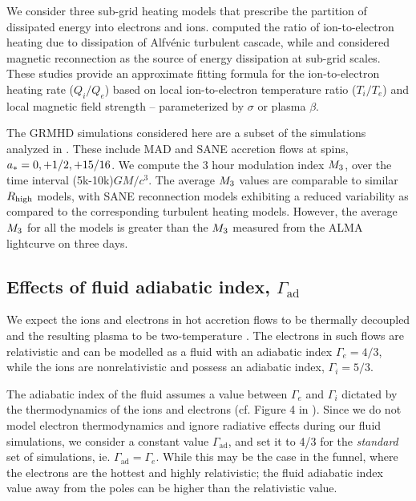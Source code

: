 We consider three sub-grid heating models that prescribe the partition of dissipated energy into electrons and ions. \citealt{2010MNRAS.409L.104H} computed the ratio of ion-to-electron heating due to dissipation of Alfv\'enic turbulent cascade, while \citealt{10.1093/mnras/stx2530} and \citealt{Rowan_2017} considered magnetic reconnection as the source of energy dissipation at sub-grid scales. These studies provide an approximate fitting formula for the ion-to-electron heating rate ($Q_{i}/Q_{e}$) based on local ion-to-electron temperature ratio ($T_{i}/T_{e}$) and local magnetic field strength -- parameterized by $\sigma$ or plasma $\beta$.

The GRMHD simulations considered here are a subset of the simulations analyzed in \citealt{2020MNRAS.494.4168D}. These include MAD and SANE accretion flows at spins, $a_* = 0,+1/2,+15/16$. We compute the 3 hour modulation index $M_{3}$, over the time interval (5k-10k)$GM/c^{3}$. The average $M_{3}$ values are comparable to similar $R_\mathrm{high}$ models, with SANE reconnection models exhibiting a reduced variability as compared to the corresponding turbulent heating models. However, the average $M_{3}$ for all the models is greater than the $M_{3}$ measured from the ALMA lightcurve on three days.

\subsection{Effects of fluid adiabatic index, \texorpdfstring{$\Gamma_\mathrm{ad}$}{Gad}}

We expect the ions and electrons in hot accretion flows to be thermally decoupled and the resulting plasma to be two-temperature \citep{1976ApJ...204..187S, Quataert_1998, 10.1093/mnras/stw3116, Ryan_2018}. The electrons in such flows are relativistic and can be modelled as a fluid with an adiabatic index $\Gamma_{e}=4/3$, while the ions are nonrelativistic and possess an adiabatic index, $\Gamma_{i}=5/3$.

The adiabatic index of the fluid assumes a value between $\Gamma_{e}$ and $\Gamma_{i}$ dictated by the thermodynamics of the ions and electrons (cf. Figure 4 in \citealt{10.1093/mnras/stw3116}). Since we do not model electron thermodynamics and ignore radiative effects during our fluid simulations, we consider a constant value $\Gamma_\mathrm{ad}$, and set it to 4/3 for the \textit{standard} set of simulations, ie. $\Gamma_\mathrm{ad}=\Gamma_{e}$. While this may be the case in the funnel, where the electrons are the hottest and highly relativistic; the fluid adiabatic index value away from the poles can be higher than the relativistic value.

